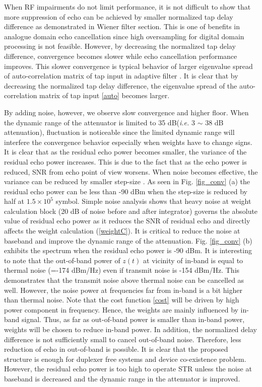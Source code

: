 \documentclass[twocolumn]{IEEEtran}
\begin{document}
When RF impairments do not limit performance, it is not difficult to
show that more suppression of echo can be achieved by smaller
normalized tap delay difference as demonstrated in Wiener filter
section. This is one of benefits in analogue domain echo
cancellation since high oversampling for digital domain processing
is not feasible. However, by decreasing the normalized tap delay
difference, convergence becomes slower while echo cancellation
performance improves. This slower convergence is typical behavior of
larger eigenvalue spread of auto-correlation matrix of tap input in
adaptive filter \cite{haykin}. It is clear that by decreasing the
normalized tap delay difference, the eigenvalue spread of the
auto-correlation matrix of tap input \eqref{auto} becomes larger.

By adding noise, however, we observe slow convergence and higher
floor. When the dynamic range of the attenuator is limited to 35
dB(\emph{i.e.} 3 $\sim$ 38 dB attenuation), fluctuation is
noticeable since the limited dynamic range will interfere the
convergence behavior especially when weights have to change signs.
It is clear that as the residual echo power becomes smaller, the
variance of the residual echo power increases. This is due to the
fact that as the echo power is reduced, SNR from echo point of view
worsens. When noise becomes effective, the variance can be reduced
by smaller step-size \cite{haykin}. As seen in Fig. \ref{fig_conv}
(a) the residual echo power can be less than -90 dBm when the
step-size is reduced by half at $1.5\times 10^5$ symbol. Simple
noise analysis shows that heavy noise at weight calculation block
(20 dB of noise before and after integrator) governs the absolute
value of residual echo power as it reduces the SNR of residual echo
and directly affects the weight calculation (\ref{weightC}). It is
critical to reduce the noise at baseband and improve the dynamic
range of the attenuation. Fig. \ref{fig_conv} (b) exhibits the
spectrum when the residual echo power is -90 dBm. It is interesting
to note that the out-of-band power of $z(t)$ at vicinity of in-band
is equal to thermal noise (=-174 dBm/Hz) even if transmit noise is
-154 dBm/Hz. This demonstrates that the transmit noise above thermal
noise can be cancelled as well. However, the noise power at
frequencies far from in-band is a bit higher than thermal noise.
Note that the cost function \eqref{cost} will be driven by high
power component in frequency. Hence, the weights are mainly
influenced by in-band signal. Thus, as far as out-of-band power is
smaller than in-band power, weights will be chosen to reduce in-band
power. In addition, the normalized delay difference is not
sufficiently small to cancel out-of-band noise. Therefore, less
reduction of echo in out-of-band is possible. It is clear that the
proposed structure is enough for duplexer free systems and device
co-existence problem. However, the residual echo power is too high
to operate STR unless the noise at baseband is decreased and the
dynamic range in the attenuator is improved.
\end{document}
